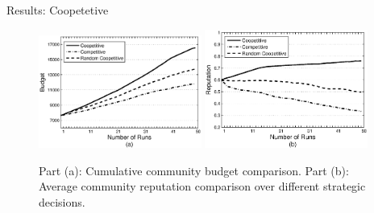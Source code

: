 \documentclass{beamer}
\begin{document}
\begin{frame}{Results: Coopetetive}
    \begin{figure}%
        \includegraphics[width=2.1in]{figures/graphbgtmed.eps}
        \includegraphics[width=2.1in]{figures/graphrep.eps}
        \caption{Part (a): Cumulative community budget comparison. Part
        (b): Average community reputation comparison over different
        strategic decisions.} \label{Graph1}
    \end{figure}
\end{frame}
\end{document}
